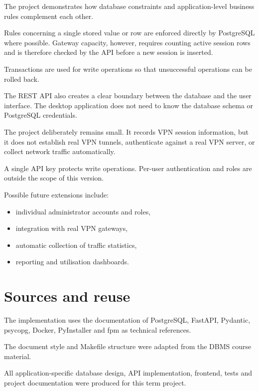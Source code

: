 \documentclass[11pt,a4paper]{article}
\begin{document}
The project demonstrates how database constraints and application-level
business rules complement each other.

Rules concerning a single stored value or row are enforced directly by
PostgreSQL where possible. Gateway capacity, however, requires counting active
session rows and is therefore checked by the API before a new session is
inserted.

Transactions are used for write operations so that unsuccessful operations
can be rolled back.

The REST API also creates a clear boundary between the database and the user
interface. The desktop application does not need to know the database schema
or PostgreSQL credentials.

The project deliberately remains small. It records VPN session information,
but it does not establish real VPN tunnels, authenticate against a real VPN
server, or collect network traffic automatically.

A single API key protects write operations. Per-user authentication and roles
are outside the scope of this version.

Possible future extensions include:

\begin{itemize}
    \item individual administrator accounts and roles,
    \item integration with real VPN gateways,
    \item automatic collection of traffic statistics,
    \item reporting and utilisation dashboards.
\end{itemize}

\section*{Sources and reuse}

The implementation uses the documentation of PostgreSQL, FastAPI, Pydantic,
psycopg, Docker, PyInstaller and fpm as technical references.

The document style and Makefile structure were adapted from the DBMS course
material.

All application-specific database design, API implementation, frontend,
tests and project documentation were produced for this term project.
\end{document}
